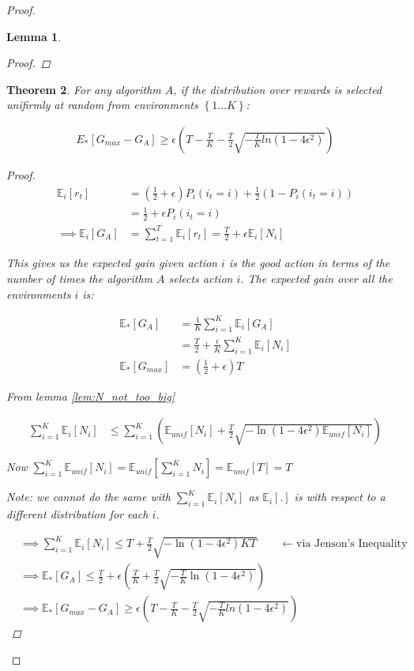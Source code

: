 \documentclass{article}
\newcommand{\E}{\mathbb E}
\newcommand{\set}[1]{\left\{#1\right\}}
\newcommand{\eqn}[1]{\begin{align}#1\end{align}}
\renewcommand{\Pi}[1]{P_i\left( #1 \right)}
\newcommand{\Ei}[1]{\E_i\left[ #1 \right]}
\newcommand{\Eu}[1]{\E_{unif}\left[ #1 \right]}
\newcommand{\Es}[1]{\E_{*}\left[ #1 \right]}
\theoremstyle{plain}
\newtheorem{theorem}{Theorem}
\newtheorem{lemma}[theorem]{Lemma}
\theoremstyle{definition}
\begin{document}
\begin{proof}
\begin{lemma}
\begin{proof}
\end{proof}
\end{lemma}

\begin{theorem}
For any algorithm $A$, if the distribution over rewards is selected unifirmly at random from environments $\set{1...K}$:

\eqn {
E_*[G_{max} - G_A] \geq \epsilon\left(T - \frac{T}{K} - \frac{T}{2}\sqrt{-\frac{T}{K}ln(1-4\epsilon^2)}  \right) 
}

\begin{proof}

\eqn{
\Ei{r_t} &= \left(\frac{1}{2}+\epsilon \right)\Pi{i_t = i} + \frac{1}{2}\left(1-\Pi{i_t = i} \right) \\
& = \frac{1}{2} + \epsilon \Pi{i_t = i}\\
\implies \Ei{G_A} &= \sum_{t=1}^T \Ei{r_t} = \frac{T}{2}+\epsilon \Ei{N_i}
}

This gives us the expected gain given action $i$ is the good action in terms of the number of times the algorithm $A$ selects action $i$. The expected gain over all the environments $i$ is:

\eqn{
\Es{G_A} &= \frac{1}{K}\sum_{i=1}^K \Ei{G_A} \\
&= \frac{T}{2} + \frac{\epsilon}{K}\sum_{i=1}^K \Ei{N_i}\\
\Es{G_{max}} &= \left(\frac{1}{2}+\epsilon \right)T
}

From lemma \ref{lem:N_not_too_big}

\eqn{
\sum_{i=1}^K\Ei{N_i} & \leq \sum_{i=1}^K \left(\Eu{N_i}+ \frac{T}{2}\sqrt{-\ln({1-4\epsilon^2})\Eu{N_i}}\right)
}

Now $\sum_{i=1}^K\Eu{N_i} = \Eu{\sum_{i=1}^K N_i} = \Eu{T} = T$ 

Note: we cannot do the same with $\sum_{i=1}^K\Ei{N_i}$ as $\Ei{.}$ is with respect to a different distribution for each $i$.

\eqn{
&\implies \sum_{i=1}^K\Ei{N_i} \leq T+ \frac{T}{2} \sqrt{-\ln(1-4\epsilon^2)KT} \qquad \leftarrow \text{via Jenson's Inequality} \\
&\implies \Es{G_A} \leq \frac{T}{2} + \epsilon\left(\frac{T}{K}+ \frac{T}{2} \sqrt{-\frac{T}{K}\ln(1-4\epsilon^2)} \right) \\ 
&\implies \Es{G_{max} - G_A} \geq \epsilon\left(T - \frac{T}{K} - \frac{T}{2}\sqrt{-\frac{T}{K}ln(1-4\epsilon^2)}  \right) 
}

\end{proof}



\end{theorem}


\end{proof}
\end{document}
